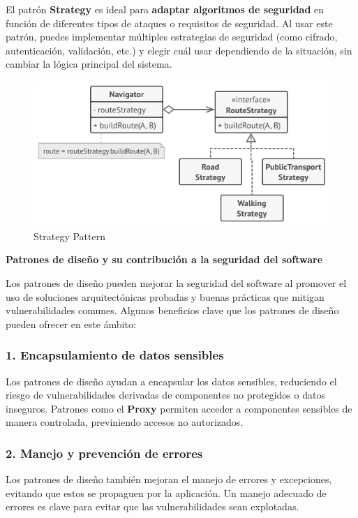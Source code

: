 El patrón \textbf{Strategy} es ideal para \textbf{adaptar algoritmos de seguridad} en función de diferentes tipos de ataques o requisitos de seguridad. Al usar este patrón, puedes implementar múltiples estrategias de seguridad (como cifrado, autenticación, validación, etc.) y elegir cuál usar dependiendo de la situación, sin cambiar la lógica principal del sistema.

\begin{figure}[H]
    \centering
    \includegraphics[width=0.5\linewidth]{PatronesSoftware/strategy.png}
    \caption{Strategy Pattern}
    \label{fig:strategy-pattern}
\end{figure}

\textbf{Patrones de diseño y su contribución a la seguridad del software} 

Los patrones de diseño pueden mejorar la seguridad del software al promover el uso de soluciones arquitectónicas probadas y buenas prácticas que mitigan vulnerabilidades comunes. Algunos beneficios clave que los patrones de diseño pueden ofrecer en este ámbito:

\subsubsection{1. \textbf{Encapsulamiento de datos sensibles}}

Los patrones de diseño ayudan a encapsular los datos sensibles, reduciendo el riesgo de vulnerabilidades derivadas de componentes no protegidos o datos inseguros. Patrones como el \textbf{Proxy} permiten acceder a componentes sensibles de manera controlada, previniendo accesos no autorizados.

\subsubsection{2. \textbf{Manejo y prevención de errores}}

Los patrones de diseño también mejoran el manejo de errores y excepciones, evitando que estos se propaguen por la aplicación. Un manejo adecuado de errores es clave para evitar que las vulnerabilidades sean explotadas.


